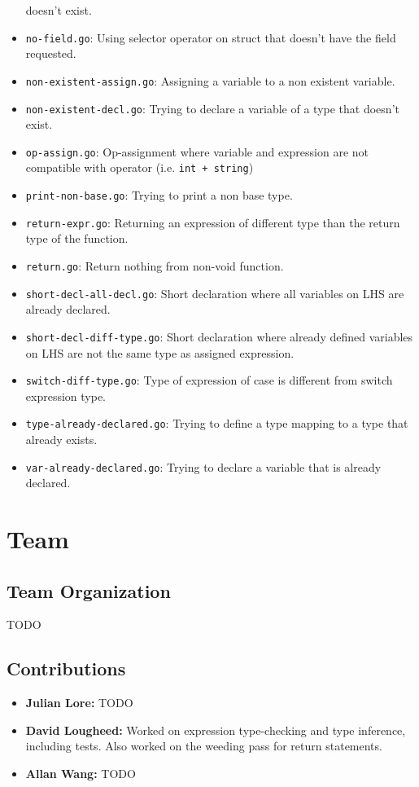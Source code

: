 \documentclass[11pt]{article}
\begin{document}
\begin{itemize}
doesn't exist.
\item \texttt{no-field.go}: Using selector operator on struct that doesn't have
the field requested.
\item \texttt{non-existent-assign.go}: Assigning a variable to a non existent
variable.
\item \texttt{non-existent-decl.go}: Trying to declare a variable of a type that
doesn't exist.
\item \texttt{op-assign.go}: Op-assignment where variable and expression are not
compatible with operator (i.e. \texttt{int + string})
\item \texttt{print-non-base.go}: Trying to print a non base type.
\item \texttt{return-expr.go}: Returning an expression of different type than the
return type of the function.
\item \texttt{return.go}: Return nothing from non-void function.
\item \texttt{short-decl-all-decl.go}: Short declaration where all variables on
LHS are already declared.
\item \texttt{short-decl-diff-type.go}: Short declaration where already defined
variables on LHS are not the same type as assigned expression.
\item \texttt{switch-diff-type.go}: Type of expression of case is different from
switch expression type.
\item \texttt{type-already-declared.go}: Trying to define a type mapping to a
type that already exists.
\item \texttt{var-already-declared.go}: Trying to declare a variable that is
already declared.
\end{itemize}
\section{Team}
\label{sec:org0d5d24d}
\subsection{Team Organization}
\label{sec:org3ef4146}
TODO
\subsection{Contributions}
\label{sec:orge2f4965}
\begin{itemize}
\item \textbf{Julian Lore:} TODO
\item \textbf{David Lougheed:} Worked on expression type-checking and type inference,
including tests. Also worked on the weeding pass for return statements.
\item \textbf{Allan Wang:} TODO
\end{itemize}
\end{document}
